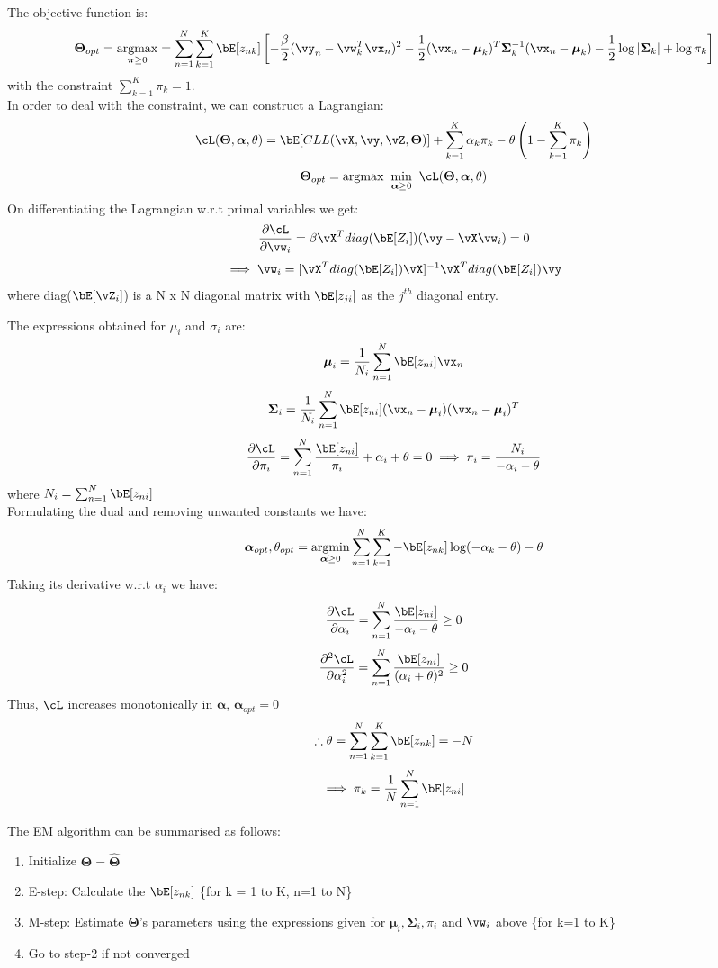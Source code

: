 \documentclass[a4paper,12pt]{article}
\begin{document}
\begin{mlsolution}
The objective function is:
\[
\boldsymbol\Theta_{opt}=\underset{\boldsymbol\pi\geq0}{\mathrm{arg max}}=\sum_{n=1}^N\sum_{k=1}^K\bE[z_{nk}]\left[-\frac{\beta}{2}(\vy_n-\vw_k^T\vx_n)^2-\frac{1}{2}(\vx_n-\boldsymbol\mu_k)^T\boldsymbol\Sigma_k^{-1}(\vx_n-\boldsymbol\mu_k)-\frac{1}{2}\log|\boldsymbol\Sigma_k|+\log\pi_k\right]
\]
with the constraint $\sum_{k=1}^K\pi_k=1$.\\

In order to deal with the constraint, we can construct a Lagrangian:
\[
\cL(\boldsymbol\Theta,\boldsymbol\alpha,\theta)=\bE[CLL(\vX,\vy,\vZ,\boldsymbol\Theta)]+\sum_{k=1}^K\alpha_k\pi_k-\theta\left(1-\sum_{k=1}^K\pi_k\right)
\]
\[
\boldsymbol\Theta_{opt}=\underset{}{\mathrm{arg max}}\;\;\underset{\boldsymbol\alpha\geq0}{\mathrm{min}}\;\;\cL(\boldsymbol\Theta,\boldsymbol\alpha,\theta)
\]
On differentiating the Lagrangian w.r.t primal variables we get:
\[
\frac{\partial\cL}{\partial\vw_i}=\beta\vX^Tdiag(\bE[Z_i])(\vy-\vX\vw_i)=0
\]
\[
\implies\vw_i=[\vX^Tdiag(\bE[Z_i])\vX]^{-1}\vX^Tdiag(\bE[Z_i])\vy
\]
where diag($\bE[\vZ_i]$) is a N x N diagonal matrix with $\bE[z_{ji}]$ as the $j^{th}$ diagonal entry.

The expressions obtained for $\mu_i$ and $\sigma_i$ are:
\[
\boldsymbol\mu_i = \frac{1}{N_i}\sum_{n=1}^N\bE[z_{ni}]\vx_n
\]
\[
\boldsymbol\Sigma_i = \frac{1}{N_i}\sum_{n=1}^N\bE[z_{ni}](\vx_n-\boldsymbol\mu_i)(\vx_n-\boldsymbol\mu_i)^T
\]
\[
\frac{\partial\cL}{\partial\pi_i}=\sum_{n=1}^N\frac{\bE[z_{ni}]}{\pi_i}+\alpha_i+\theta=0\implies\pi_i=\frac{N_i}{-\alpha_i-\theta}
\]
where $N_i=\sum_{n=1}^N\bE[z_{ni}]$\\
Formulating the dual and removing unwanted constants we have:
\[
\boldsymbol\alpha_{opt},\theta_{opt}=\underset{\boldsymbol\alpha\geq0}{\mathrm{arg min}} \sum_{n=1}^N\sum_{k=1}^K-\bE[z_{nk}]\log(-\alpha_k-\theta)-\theta
\]
Taking its derivative w.r.t $\alpha_i$ we have:
\[
\frac{\partial\cL}{\partial\alpha_i}=\sum_{n=1}^N\frac{\bE[z_{ni}]}{-\alpha_i-\theta}\geq0
\]
\[\frac{\partial^2\cL}{\partial\alpha_i^2}=\sum_{n=1}^N\frac{\bE[z_{ni}]}{(\alpha_i+\theta)^2}\geq0
\]
Thus, $\cL$ increases monotonically in $\boldsymbol\alpha$, $\boldsymbol\alpha_{opt}=0$
\[
    \therefore\theta = \sum_{n=1}^N\sum_{k=1}^K\bE[z_{nk}]=-N
\]
\[
    \implies\pi_k=\frac{1}{N}\sum_{n=1}^N\bE[z_{ni}]
\]

The EM algorithm can be summarised as follows:

\begin{enumerate}
\item Initialize $\boldsymbol\Theta=\hat{\boldsymbol\Theta}$
\item E-step: Calculate the $\bE[z_{nk}]$ \{for k = 1 to K, n=1 to N\}
\item M-step: Estimate $\boldsymbol\Theta$'s parameters using the expressions given for $\boldsymbol\mu_i,\boldsymbol\Sigma_i,\pi_i$ and $\vw_i$ above \{for k=1 to K\}
\item Go to step-2 if not converged
\end{enumerate}


\end{mlsolution}
\end{document}
